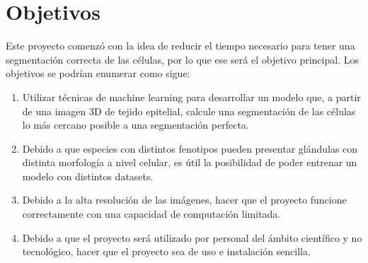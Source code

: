 \chapter{Objetivos}

Este proyecto comenzó con la idea de reducir el tiempo necesario para tener una segmentación correcta de las células, por lo que ese será el objetivo principal. Los objetivos se podrían enumerar como sigue:

\begin{enumerate}
\item Utilizar técnicas de machine learning para desarrollar un modelo que, a partir de una imagen 3D de tejido epitelial, calcule una segmentación de las células lo más cercano posible a una segmentación perfecta.
\item Debido a que especies con distintos fenotipos pueden presentar glándulas con distinta morfología a nivel celular, es útil la posibilidad de poder entrenar un modelo con distintos datasets.
\item Debido a la alta resolución de las imágenes, hacer que el proyecto funcione correctamente con una capacidad de computación limitada.
\item Debido a que el proyecto será utilizado por personal del ámbito científico y no tecnológico, hacer que el proyecto sea de uso e instalación sencilla.
\end{enumerate}